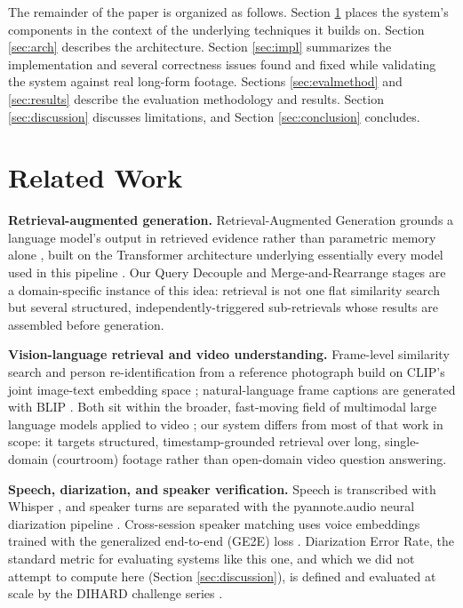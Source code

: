 \documentclass[3p,times,procedia]{elsarticle}
\begin{document}
The remainder of the paper is organized as follows. Section \ref{sec:related} places
the system's components in the context of the underlying techniques it builds on.
Section \ref{sec:arch} describes the architecture. Section \ref{sec:impl} summarizes
the implementation and several correctness issues found and fixed while validating the
system against real long-form footage. Sections \ref{sec:evalmethod} and
\ref{sec:results} describe the evaluation methodology and results. Section
\ref{sec:discussion} discusses limitations, and Section \ref{sec:conclusion}
concludes.

\section{Related Work}
\label{sec:related}

\textbf{Retrieval-augmented generation.} Retrieval-Augmented Generation grounds a
language model's output in retrieved evidence rather than parametric memory alone
\cite{lewis2020}, built on the Transformer architecture underlying essentially every
model used in this pipeline \cite{vaswani2017}. Our Query Decouple and Merge-and-Rearrange
stages are a domain-specific instance of this idea: retrieval is not one flat similarity
search but several structured, independently-triggered sub-retrievals whose results are
assembled before generation.

\textbf{Vision-language retrieval and video understanding.} Frame-level similarity search
and person re-identification from a reference photograph build on CLIP's joint
image-text embedding space \cite{radford2021}; natural-language frame captions are
generated with BLIP \cite{li2022}. Both sit within the broader, fast-moving field of
multimodal large language models applied to video \cite{yin2023survey}; our system
differs from most of that work in scope: it targets structured, timestamp-grounded
retrieval over long, single-domain (courtroom) footage rather than open-domain video
question answering.

\textbf{Speech, diarization, and speaker verification.} Speech is transcribed with
Whisper \cite{radford2023}, and speaker turns are separated with the pyannote.audio
neural diarization pipeline \cite{bredin2020}. Cross-session speaker matching uses voice
embeddings trained with the generalized end-to-end (GE2E) loss \cite{wan2018}.
Diarization Error Rate, the standard metric for evaluating systems like this one, and
which we did not attempt to compute here (Section \ref{sec:discussion}), is defined and
evaluated at scale by the DIHARD challenge series \cite{ryant2020dihard}.
\end{document}
